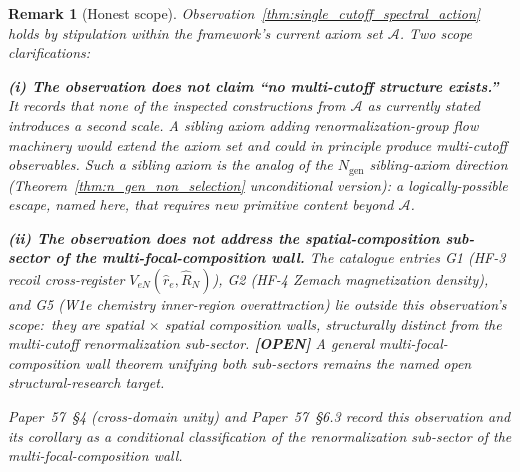 \documentclass[11pt]{article}
\newtheorem{remark}{Remark}
\begin{document}
\begin{remark}[Honest scope]
\label{rem:single_cutoff_scope}
Observation~\ref{thm:single_cutoff_spectral_action} holds by
stipulation within the framework's current axiom set $\mathcal{A}$.  Two scope
clarifications:

\textbf{(i) The observation does not claim ``no multi-cutoff structure
exists.''}  It records that none of the inspected constructions from
$\mathcal{A}$ \emph{as currently stated} introduces a second scale.  A
sibling axiom adding renormalization-group flow machinery would
extend the axiom set and could in principle produce multi-cutoff
observables.  Such a sibling axiom is the analog of the
$N_{\mathrm{gen}}$ sibling-axiom direction
(\emph{Theorem~\ref{thm:n_gen_non_selection}} unconditional version):
a logically-possible escape, named here, that requires new primitive
content beyond $\mathcal{A}$.

\textbf{(ii) The observation does not address the spatial-composition
sub-sector of the multi-focal-composition wall.}  The catalogue
entries G1 (HF-3 recoil cross-register $V_{eN}(\hat r_e, \hat R_N)$),
G2 (HF-4 Zemach magnetization density), and G5 (W1e chemistry
inner-region overattraction) lie outside this observation's scope:\ they
are spatial $\times$ spatial composition walls, structurally distinct
from the multi-cutoff renormalization sub-sector.  \textbf{[OPEN]} A general
multi-focal-composition wall theorem unifying both sub-sectors
remains the named open structural-research target.

Paper~57~\S 4 (cross-domain unity) and Paper~57~\S 6.3 record this
observation and its corollary as a conditional classification of the
renormalization sub-sector of the multi-focal-composition wall.
\end{remark}

\end{document}
